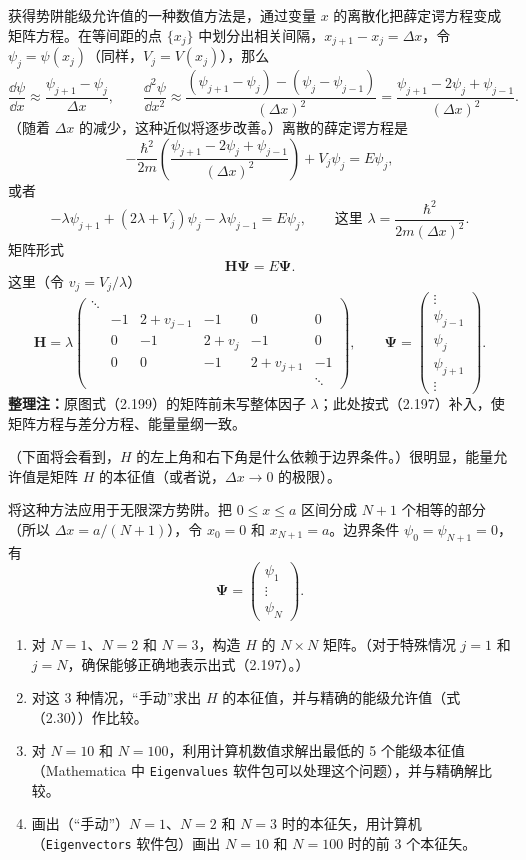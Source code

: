 \begingroup\small
\setlength{\abovedisplayskip}{4pt}
\setlength{\belowdisplayskip}{4pt}
获得势阱能级允许值的一种数值方法是，通过变量 $x$ 的离散化把薛定谔方程变成矩阵方程。在等间距的点 $\{x_j\}$ 中划分出相关间隔，$x_{j+1}-x_j=\Delta x$，令 $\psi_j=\psi(x_j)$（同样，$V_j=V(x_j)$），那么
\[
\frac{\dd\psi}{\dd x}\approx\frac{\psi_{j+1}-\psi_j}{\Delta x},\qquad
\frac{\dd^2\psi}{\dd x^2}\approx
\frac{(\psi_{j+1}-\psi_j)-(\psi_j-\psi_{j-1})}{(\Delta x)^2}
=\frac{\psi_{j+1}-2\psi_j+\psi_{j-1}}{(\Delta x)^2}.
\]
（随着 $\Delta x$ 的减少，这种近似将逐步改善。）离散的薛定谔方程是
\[
-\frac{\hbar^2}{2m}\left(\frac{\psi_{j+1}-2\psi_j+\psi_{j-1}}{(\Delta x)^2}\right)
+V_j\psi_j=E\psi_j,
\]
或者
\[
-\lambda\psi_{j+1}+(2\lambda+V_j)\psi_j-\lambda\psi_{j-1}=E\psi_j,
\qquad\text{这里 }\lambda=\frac{\hbar^2}{2m(\Delta x)^2}.
\]
矩阵形式
\[
\boldsymbol H\boldsymbol\Psi=E\boldsymbol\Psi.
\]
这里（令 $v_j=V_j/\lambda$）
\[
\boldsymbol H=\lambda
\begin{pmatrix}
\ddots&&&&&\\
&-1&2+v_{j-1}&-1&0&0\\
&0&-1&2+v_j&-1&0\\
&0&0&-1&2+v_{j+1}&-1\\
&&&&&\ddots
\end{pmatrix},
\qquad
\boldsymbol\Psi=\begin{pmatrix}\vdots\\\psi_{j-1}\\\psi_j\\\psi_{j+1}\\\vdots\end{pmatrix}.
\]
\textbf{整理注：}原图式（2.199）的矩阵前未写整体因子 $\lambda$；此处按式（2.197）补入，使矩阵方程与差分方程、能量量纲一致。

（下面将会看到，$H$ 的左上角和右下角是什么依赖于边界条件。）很明显，能量允许值是矩阵 $H$ 的本征值（或者说，$\Delta x\to0$ 的极限）。

将这种方法应用于无限深方势阱。把 $0\leq x\leq a$ 区间分成 $N+1$ 个相等的部分（所以 $\Delta x=a/(N+1)$），令 $x_0=0$ 和 $x_{N+1}=a$。边界条件 $\psi_0=\psi_{N+1}=0$，有
\[
\boldsymbol\Psi=\begin{pmatrix}\psi_1\\\vdots\\\psi_N\end{pmatrix}.
\]
\begin{enumerate}
\item 对 $N=1$、$N=2$ 和 $N=3$，构造 $H$ 的 $N\times N$ 矩阵。（对于特殊情况 $j=1$ 和 $j=N$，确保能够正确地表示出式（2.197）。）
\item 对这 3 种情况，“手动”求出 $H$ 的本征值，并与精确的能级允许值（式（2.30））作比较。
\item 对 $N=10$ 和 $N=100$，利用计算机数值求解出最低的 5 个能级本征值（Mathematica 中 \texttt{Eigenvalues} 软件包可以处理这个问题），并与精确解比较。
\item 画出（“手动”）$N=1$、$N=2$ 和 $N=3$ 时的本征矢，用计算机（\texttt{Eigenvectors} 软件包）画出 $N=10$ 和 $N=100$ 时的前 3 个本征矢。
\end{enumerate}
\endgroup
\vfill

